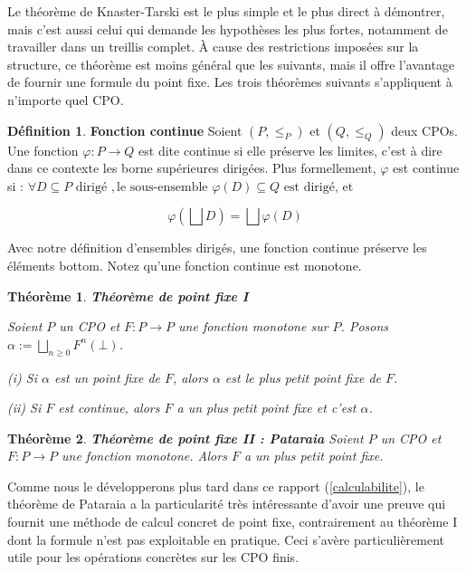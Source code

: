 \documentclass{article}
\newcommand{\yz}[1]{\textcolor{blue}{{[YZ:~#1]}}}
\newtheorem{theorem}{Théorème}[section]
\theoremstyle{definition}
\newtheorem{definition}{Définition}[section]
\begin{document}
Le théorème de Knaster-Tarski est le plus simple et le plus direct à démontrer, mais c'est aussi celui qui demande les hypothèses les plus fortes, notamment de travailler dans un treillis complet. À cause des restrictions imposées sur la structure, ce théorème est moins général que les suivants, mais il offre l'avantage de fournir une formule du point fixe. Les trois théorèmes suivants s'appliquent à n'importe quel CPO.

\begin{definition}{\textbf{Fonction continue}}
Soient $(P, \leq_P)$ et $(Q, \leq_Q)$ deux CPOs. Une fonction $\varphi : P \rightarrow Q$ est dite continue si elle préserve les limites, c'est à dire dans ce contexte les borne supérieures dirigées. Plus formellement, $\varphi$ est continue si :
$\forall D \subseteq P \text{ dirigé }, \text{le sous-ensemble } \varphi(D) \subseteq Q \text{ est dirigé, et }$

$$ \varphi(\bigsqcup D) = \bigsqcup \varphi(D) $$

Avec notre définition d'ensembles dirigés, une fonction continue préserve les éléments bottom.
Notez qu'une fonction continue est monotone.
\end{definition}

\begin{theorem}{\textbf{Théorème de point fixe I}}

Soient $P$ un CPO et $F : P \rightarrow P$ une fonction monotone sur $P$. Posons $\alpha := \bigsqcup_{n \geq 0}F^n(\bot)$.

(i) Si $\alpha$ est un point fixe de $F$, alors $\alpha$ est le plus petit point fixe de $F$.

(ii) Si $F$ est continue, alors $F$ a un plus petit point fixe et c'est $\alpha$.

\end{theorem}

\begin{theorem}{\textbf{Théorème de point fixe II : Pataraia}}
Soient $P$ un CPO et $F : P \rightarrow P$ une fonction monotone. Alors $F$ a un plus petit point fixe.
\end{theorem}

Comme nous le développerons plus tard dans ce rapport (\ref{calculabilite}), le théorème de Pataraia a
la particularité très intéressante d'avoir une preuve qui fournit une méthode de calcul concret de point fixe, contrairement au théorème I dont la formule n'est pas exploitable en pratique. Ceci s'avère particulièrement utile pour les opérations concrètes sur les CPO finis. %
\end{document}
